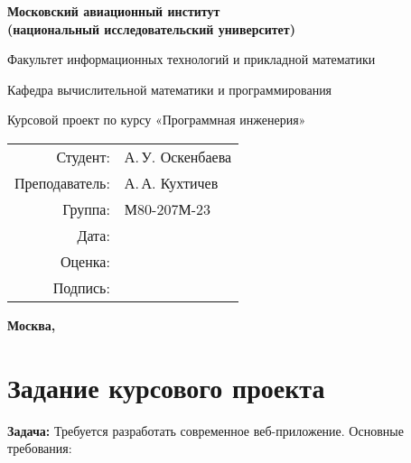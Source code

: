 \documentclass[a4paper,12pt]{article}
\begin{document}
\begin{titlepage}
\begin{center}
\bfseries
{\Large Московский авиационный институт\\
(национальный исследовательский университет)}

\vspace{48pt}
{\large Факультет информационных технологий и прикладной математики}

\vspace{36pt}
{\large Кафедра вычислительной математики и программирования}

\vspace{48pt}
Курсовой проект по курсу «Программная инженерия»

\end{center}

\vspace{72pt}
\begin{flushright}
\begin{tabular}{rl}
Студент: & А.\,У. Оскенбаева \\
Преподаватель: & А.\,А. Кухтичев \\
Группа: & М80-207М-23 \\
Дата: & \\
Оценка: & \\
Подпись: & \\
\end{tabular}
\end{flushright}

\vfill
\begin{center}
\bfseries
Москва, \the\year
\end{center}
\end{titlepage}

\newpage

\section*{Задание курсового проекта}

\textbf{Задача:} Требуется разработать современное веб-приложение. Основные требования:
\end{document}
